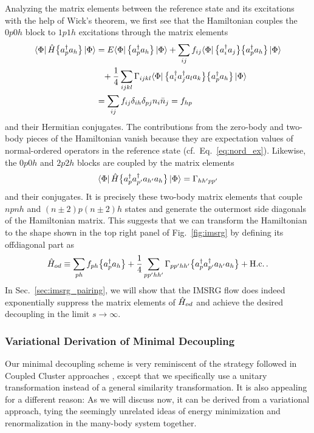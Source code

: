 Analyzing the matrix elements between the reference state and its
excitations with the help of Wick's theorem, we first see that the 
Hamiltonian couples the $0p0h$ block to $1p1h$ excitations through 
the matrix elements
\begin{align}
\matrixe{\Phi}{\HO\nord{\aaO_{p}\aO_{h}}}{\Phi}
  &=E\matrixe{\Phi}{\nord{\aaO_{p}\aO_{h}}}{\Phi}
    +\sum_{ij}f_{ij}\matrixe{\Phi}{\nord{\aaO_{i}\aO_{j}}\nord{\aaO_{p}\aO_{h}}}{\Phi}\notag\\
  &\hphantom{=}+\frac{1}{4}\sum_{ijkl}\Gamma_{ijkl}
      \matrixe{\Phi}{\nord{\aaO_{i}\aaO_{j}\aO_{l}\aO_{k}}\nord{\aaO_{p}\aO_{h}}}{\Phi}\notag\\
  &=\sum_{ij}f_{ij}\delta_{ih}\delta_{pj}n_i\nn_j = f_{hp} \label{eq:coupl_1p1h}
\end{align}
and their Hermitian conjugates. The contributions from the zero-body and 
two-body pieces of the Hamiltonian vanish because they are expectation
values of normal-ordered operators in the reference state (cf.~Eq.~\eqref{eq:nord_ex}).
Likewise, the $0p0h$ and $2p2h$ blocks are coupled by the matrix elements
\begin{equation}
\langle{\Phi}|\,{\hat{H}\big\{a^\dag_{p}a^\dag_{p'}a_{h'}a_{h}\big\}}\,|{\Phi}\rangle = \Gamma_{hh'pp'}
\end{equation}
and their conjugates. It is precisely these two-body matrix elements 
that couple $npnh$ and $(n\pm2)p(n\pm2)h$ states and generate the
outermost side diagonals of the Hamiltonian matrix. This suggests that 
we can transform the Hamiltonian to the shape shown in the top right panel
of Fig.~\ref{fig:imsrg} by defining its offdiagonal part as
\begin{equation}
  \hat{H}_{od} \equiv \sum_{ph}f_{ph}\big\{a^\dag_{p}a_{h}\big\} + 
              \frac{1}{4}\sum_{pp'hh'}\Gamma_{pp'hh'}\big\{a^\dag_{p}a^\dag_{p'}a_{h'}a_{h}\big\} + \text{H.c.}\,.
\end{equation}
In Sec.~\ref{sec:imsrg_pairing}, we will show that the IMSRG flow does indeed
exponentially suppress the matrix elements of $\hat{H}_{od}$ and 
achieve the desired decoupling in the limit $s\to\infty$. 

%
%
\subsubsection{\label{sec:imsrg_variational}Variational Derivation of Minimal Decoupling}
Our minimal decoupling scheme is very reminiscent of the strategy 
followed in Coupled Cluster approaches \cite{Shavitt:2009,Hagen:2014ve}, except 
that we specifically use a unitary transformation instead of a general 
similarity transformation. It is also appealing for a different reason: As 
we will discuss now, it can be derived from a variational approach, tying
the seemingly unrelated ideas of energy minimization and renormalization 
in the many-body system together. 

